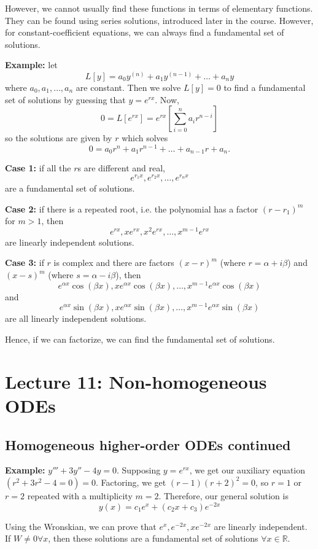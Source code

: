 \documentclass[11pt]{article}
\newcommand{\example}{\textbf{Example: }}
\begin{document}
	However, we cannot usually find these functions in terms of elementary functions. They can be found using series solutions, introduced later in the course. However, for constant-coefficient equations, we can always find a fundamental set of solutions.

	\example let
		$$ L[y] = a_0 y^{(n)} + a_1 y^{(n-1)} + \ldots + a_n y $$
	where $a_0, a_1, \ldots, a_n$ are constant. Then we solve $L[y] = 0$ to find a fundamental set of solutions by guessing that $y = e^{rx}$. Now,
		$$ 0 = L[e^{rx}] = e^{rx}\left[\sum_{i=0}^n a_i r^{n-i}\right] $$
	so the solutions are given by $r$ which solves
		$$ 0 = a_0 r^n + a_1 r^{n-1} + \ldots + a_{n-1} r + a_n. $$

	\textbf{Case 1:} if all the $r$s are different and real,
		$$ e^{r_1 x}, e^{r_2 x}, \ldots, e^{r_n x} $$
	are a fundamental set of solutions.

	\textbf{Case 2:} if there is a repeated root, i.e. the polynomial has a factor $(r-r_1)^m$ for $m > 1$, then
		$$ e^{rx}, x e^{rx}, x^2 e^{rx}, \ldots, x^{m-1} e^{rx} $$
	are linearly independent solutions.

	\textbf{Case 3:} if $r$ is complex and there are factors $(x - r)^m$ (where $r = \alpha + i \beta$) and $(x - s)^m$ (where $s = \alpha - i \beta$), then
		$$ e^{\alpha x} \cos (\beta x), x e^{\alpha x} \cos (\beta x), \ldots, x^{m-1} e^{\alpha x} \cos (\beta x) $$
	and
		$$ e^{\alpha x} \sin (\beta x), x e^{\alpha x} \sin (\beta x), \ldots, x^{m-1} e^{\alpha x} \sin (\beta x) $$
	are all linearly independent solutions.

	Hence, if we can factorize, we can find the fundamental set of solutions.

\section{Lecture 11: Non-homogeneous ODEs}
\subsection{Homogeneous higher-order ODEs continued}
	\example $y''' + 3 y'' - 4 y = 0$. Supposing $y = e^{rx}$, we get our auxiliary equation $(r^2 + 3 r^2 - 4 = 0)=0$.
	Factoring, we get $(r-1)(r+2)^2 = 0$, so $r = 1$ or $r=2$ repeated with a multiplicity $m=2$. Therefore, our general solution is
		$$ y(x) = c_1 e^x + (c_2 x + c_3) e^{-2x} $$

	Using the Wronskian, we can prove that $e^x, e^{-2x}, xe^{-2x}$ are linearly independent. If $W \neq 0 \forall x$, then these solutions are a fundamental set of solutions $\forall x \in \mathbb{R}$.
\end{document}
